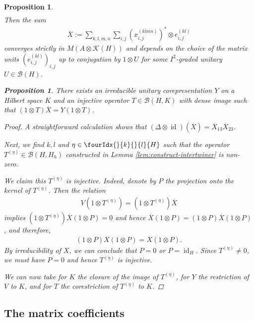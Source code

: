 \documentclass[11pt]{article}
\DeclareMathOperator{\id}{id}
\newcommand{\Gr}[5]{\fourIdx{#2}{#4}{#3}{#5}{#1}}%
\newcommand{\Grd}[3]{\Gr{#1}{}{}{#2}{#3}}
\newtheorem{Prop}[Theorem]{Proposition}
\theoremstyle{definition}
\numberwithin{equation}{section}
\begin{document}
\begin{Prop}
\begin{align*}
  \end{align*}
Then the sum
\begin{align*}
\overline{X}:=  \sum_{k,l,m,n} \sum_{i,j} (x^{(klmn)}_{i,j})^{*} \otimes
  e^{(kl)}_{i,j} 
\end{align*}
converges strictly in $M(A \otimes \mathcal{K}(H))$ and depends on the
choice of the matrix units $(e^{(kl)}_{i,j})_{i,j}$ up to conjugation
by $1\otimes U$ for some $I^{2}$-graded unitary $U\in \mathcal{B}(H)$.
\begin{Prop}
There exists an irreducible unitary corepresentation $Y$ on a Hilbert
space $K$ and an injective operator $T\in \mathcal{B}(H,K)$  with
dense image such that $(1\otimes
T)\overline{X} =Y(1\otimes T)$.
\end{Prop}
\begin{proof}
  A straightforward calculation shows that $(\Delta \otimes
  \id)(\overline{X}) = \overline{X}_{13}\overline{X}_{23}$.



  Next, we find $k,l$ and $\eta\in \Grd{H}{k}{l}$ such that the
  operator $T^{(\eta)} \in \mathcal{B}(H,H_{h})$ constructed in Lemma
  \ref{lem:construct-intertwiner} is non-zero. 

  We claim this $T^{(\eta)}$ is injective.  Indeed, denote by $P$ the
  projection onto the kernel of $T^{(\eta)}$. Then the relation
\begin{align*}
  V(1\otimes T^{(\eta)}) = (1\otimes T^{(\eta)})\overline{X}
\end{align*}
implies
$(1 \otimes T^{(\eta)})  \overline{X}(1 \otimes P) = 0$
and hence
$\overline{X}(1 \otimes P)  = (1 \otimes P)  \overline{X}(1 \otimes
P)$, and therefore,
\begin{align*}
  (1 \otimes P)X(1\otimes P) = X(1\otimes P).
\end{align*}
By irreducibility of $X$, we can conclude that $P=0$ or
$P=\id_{H}$. Since $T^{(\eta)}\neq 0$, we must have $P=0$ and hence
$T^{(\eta)}$ is injective. 

We can now take for $K$ the closure of the image of $T^{(\eta)}$, for
$Y$ the restriction of $V$ to $K$,  and
for $T$ the corestriction of $T^{(\eta)}$ to $K$.
\end{proof}

\subsection{The matrix coefficients}


\end{Prop}
\end{document}
